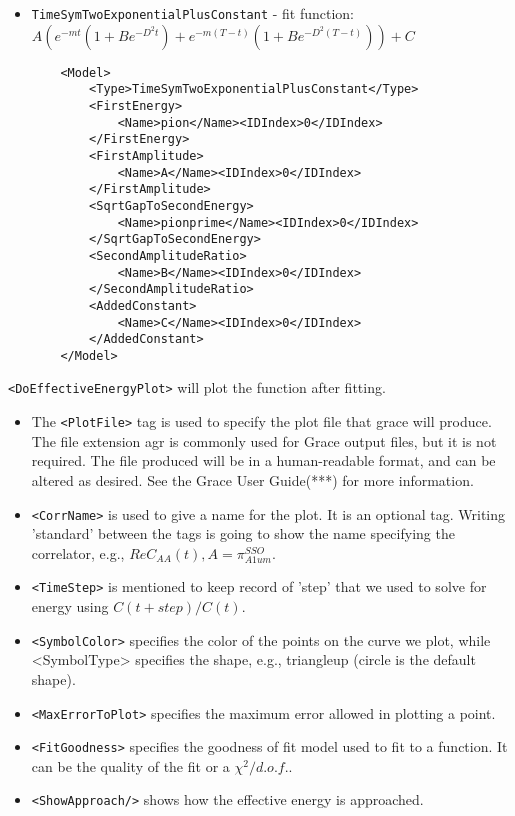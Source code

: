 \documentclass[12pt,notitlepage,letterpaper]{article}
\newcommand{\vb}{\texttt}
\begin{document}
\begin{itemize}
\item \vb{TimeSymTwoExponentialPlusConstant} - fit function: $A(e^{-mt}(1 + B e^{-D^2t} ) + e^{-m(T-t)}(1 + B e^{-D^2(T-t)})) + C$
\begin{verbatim}
    <Model>
        <Type>TimeSymTwoExponentialPlusConstant</Type>
        <FirstEnergy>
            <Name>pion</Name><IDIndex>0</IDIndex>
        </FirstEnergy>
        <FirstAmplitude>
            <Name>A</Name><IDIndex>0</IDIndex>
        </FirstAmplitude>
        <SqrtGapToSecondEnergy>
            <Name>pionprime</Name><IDIndex>0</IDIndex>
        </SqrtGapToSecondEnergy>
        <SecondAmplitudeRatio>
            <Name>B</Name><IDIndex>0</IDIndex>
        </SecondAmplitudeRatio>
        <AddedConstant>
            <Name>C</Name><IDIndex>0</IDIndex>
        </AddedConstant>
    </Model>
\end{verbatim}
\end{itemize}

\vb{<DoEffectiveEnergyPlot>} will plot the function after fitting.

\begin{itemize}
\item The \vb{<PlotFile>} tag is used to specify the plot file that grace will produce. The file extension agr is commonly used for Grace output files, but it is not required. The file produced will be in a human-readable format, and can be altered as desired. See the Grace User Guide(***) for more information.

\item \vb{<CorrName>} is used to give a name for the plot. It is an optional tag. Writing 'standard' between the tags is going to show the name specifying the correlator, e.g., $Re C_{AA}(t), A = \pi_{A1um}^{SSO}$.

\item \vb{<TimeStep>} is mentioned to keep record of 'step' that we used to solve for energy using $C(t+step)/C(t)$.

\item \vb{<SymbolColor>} specifies the color of the points on the curve we plot, while <SymbolType> specifies the shape, e.g., triangleup (circle is the default shape).

\item \vb{<MaxErrorToPlot>} specifies the maximum error allowed in plotting a point.

\item \vb{<FitGoodness>} specifies the goodness of fit model used to fit to a function. It can be the
quality of the fit or a $\chi^2/d.o.f.$. 

\item \vb{<ShowApproach/>} shows how the effective energy is approached.
\end{itemize}
\end{document}
